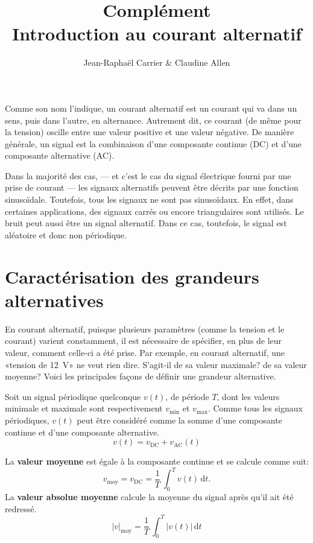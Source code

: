 \documentclass[12pt,oneside,letterpaper]{article}
\begin{document}
\title{\textbf{Complément}\\Introduction au courant alternatif}
\author{Jean-Raphaël Carrier \& Claudine Allen}
\date{}
\maketitle


Comme son nom l'indique, un courant alternatif est un courant qui va dans un sens, puis dans l'autre, en alternance. Autrement dit, ce courant (de même pour la tension) oscille entre une valeur positive et une valeur négative. De manière générale, un signal est la combinaison d'une composante continue (DC) et d'une composante alternative (AC).

Dans la majorité des cas, --- et c'est le cas du signal électrique fourni par une prise de courant --- les signaux alternatifs peuvent être décrits par une fonction sinusoïdale. Toutefois, tous les signaux ne sont pas sinusoïdaux. En effet, dans certaines applications, des signaux carrés ou encore triangulaires sont utilisés. Le bruit peut aussi être un signal alternatif. Dans ce cas, toutefois, le signal est aléatoire et donc non périodique.


\section{Caractérisation des grandeurs alternatives}

En courant alternatif, puisque plusieurs paramètres (comme la tension et le courant) varient constamment, il est nécessaire de spécifier, en plus de leur valeur, comment celle-ci a été prise. Par exemple, en courant alternatif, une «tension de 12~V» ne veut rien dire. S'agit-il de sa valeur maximale? de sa valeur moyenne? Voici les principales façons de définir une grandeur alternative.

Soit un signal périodique quelconque $v\!\left(t\right)$, de période $T$, dont les valeurs minimale et maximale sont respectivement $v_{\mathrm{min}}$ et $v_{\mathrm{max}}$. Comme tous les signaux périodiques, $v\!\left(t\right)$ peut être considéré comme la somme d'une composante continue et d'une composante alternative.
\begin{equation}
v\!\left(t\right)=v_{\mathrm{DC}}+v_{\mathrm{AC}}\!\left(t\right)
\end{equation}

La \textbf{valeur moyenne} est égale à la composante continue et se calcule comme suit:
\begin{equation}
v_{\mathrm{moy}}=v_{\mathrm{DC}}=\frac{1}{T}\,\int_0^T v\!\left(t\right)\,\mathrm{d}t.
\end{equation}
La \textbf{valeur absolue moyenne} calcule la moyenne du signal après qu'il ait été redressé.
\begin{equation}
\left|v\right|_{\mathrm{moy}}=\frac{1}{T}\,\int_0^T \left|v\!\left(t\right)\right|\,\mathrm{d}t
\end{equation}
\end{document}
